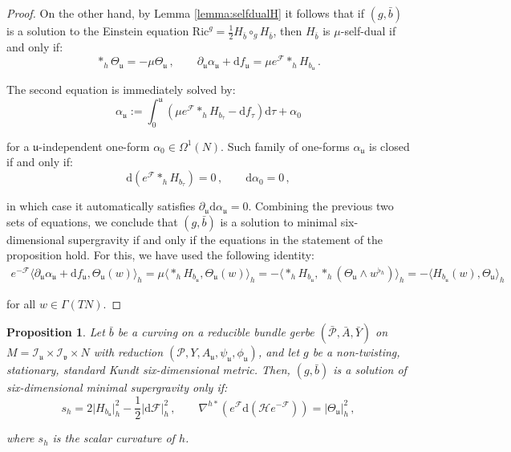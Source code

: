 \documentclass[10pt,a4paper,twoside,reqno]{amsart}
\theoremstyle{plain}
\newtheorem{prop}[thm]{Proposition}
\theoremstyle{definition}
\theoremstyle{remark}
\def\dd{\mathrm{d}}
\def\cH{\mathcal{H}}
\def\cI{\mathcal{I}}
\def\cP{\mathcal{P}}
\def\cP{\mathcal{P}}
\def\cF{\mathcal{F}}
\def\cH{\mathcal{H}}
\def\dd{\mathrm{d}}
\def\fru{\mathfrak{u}}
\def\frv{\mathfrak{v}}
\begin{document}
\begin{proof}
\noindent
On the other hand, by Lemma \ref{lemma:selfdualH} it follows that if $(g,\bar{b})$ is a solution to the Einstein equation $\mathrm{Ric}^g = \frac{1}{2} H_{\bar{b}} \circ_g H_{\bar{b}}$, then $H_{\bar{b}}$ is $\mu$-self-dual if and only if:
\begin{equation*}
\ast_h\Theta_{\fru} = -\mu \Theta_{\fru}\, , \qquad  \partial_{\fru}\alpha_{\fru} + \dd f_{\fru}= \mu e^{\cF} \ast_h H_{b_{\fru}}\, .
\end{equation*}

\noindent
The second equation is immediately solved by:
\begin{equation*}
\alpha_\fru:=\int_{0}^{\fru}(\mu e^{\cF} \ast_h H_{b_{\tau}}-\dd f_{\tau}) \dd \tau + \alpha_0
\end{equation*}

\noindent
for a $\fru$-independent one-form $\alpha_0\in \Omega^1(N)$. Such family of one-forms $\alpha_{\fru}$ is closed if and only if:
\begin{equation*}
\dd(e^{\cF} \ast_h H_{b_{\tau}}) = 0\, , \qquad \dd\alpha_0 = 0\, ,
\end{equation*}

\noindent
in which case it automatically satisfies $\partial_{\fru}\dd\alpha_{\fru} = 0$. Combining the previous two sets of equations, we conclude that $(g,\bar{b})$ is a solution to minimal six-dimensional supergravity if and only if the equations in the statement of the proposition hold. For this, we have used the following identity:
\begin{eqnarray*}
e^{-\cF}\langle \partial_{\fru}\alpha_{\fru} + \dd f_{\fru}, \Theta_{\fru}(w)  \rangle_h = \mu \langle \ast_h H_{b_{\fru}}, \Theta_{\fru}(w)  \rangle_h  = -\langle \ast_h H_{b_{\fru}}, \ast_h (\Theta_{\fru}\wedge w^{\flat_h})  \rangle_h = -\langle  H_{b_{\fru}}(w) ,  \Theta_{\fru}  \rangle_h
\end{eqnarray*}

\noindent
for all $w\in\Gamma(TN)$.
\end{proof}

\begin{prop}
\label{prop:onlycompactwave}
Let $\bar{b}$ be a curving on a reducible bundle gerbe $(\bar{\cP},\bar{A},\bar{Y})$ on $M = \cI_{\fru}\times \cI_{\frv}\times N$ with reduction $(\cP,Y,A_{\fru} , \psi_{\fru} , \phi_{\fru})$, and let $g$ be a non-twisting, stationary, standard Kundt six-dimensional metric. Then, $(g,\bar{b})$ is a solution of six-dimensional minimal supergravity only if:
\begin{equation*}
s_h = 2 \vert H_{b_{\fru}}\vert^2_h - \frac{1}{2}\vert\dd \cF\vert^2_h \, , \qquad \nabla^{h\ast}(e^{\cF} \dd (\cH e^{-\cF})) =   \vert \Theta_{\fru}\vert^2_h \, ,
\end{equation*}

\noindent
where $s_h$ is the scalar curvature of $h$.
\end{prop}
\end{document}
